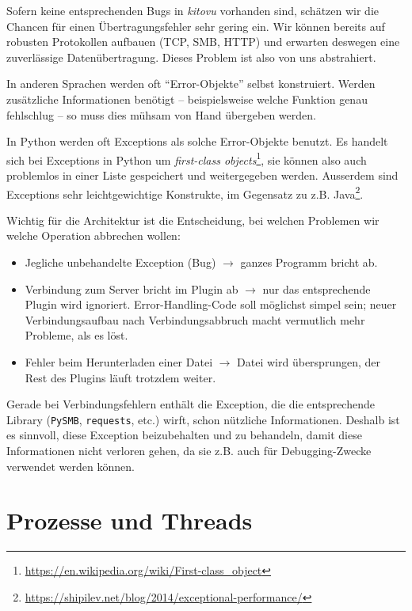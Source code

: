 \documentclass[a4paper]{article}
\let\oldsection\section
\renewcommand\section{\clearpage\oldsection}
\begin{document}
Sofern keine entsprechenden Bugs in \emph{kitovu} vorhanden sind, schätzen wir die
Chancen für einen Übertragungsfehler sehr gering ein. Wir können bereits auf robusten Protokollen aufbauen
(TCP, SMB, HTTP) und erwarten deswegen eine zuverlässige Datenübertragung. Dieses Problem ist also von uns abstrahiert.

In anderen Sprachen werden oft ``Error-Objekte'' selbst konstruiert. Werden
zusätzliche Informationen benötigt -- beispielsweise welche Funktion genau fehlschlug -- so muss dies mühsam von Hand übergeben werden.

In Python werden oft Exceptions als solche Error-Objekte benutzt. Es handelt
sich bei Exceptions in Python um \emph{first-class
  objects}\footnote{\url{https://en.wikipedia.org/wiki/First-class_object}}, sie
können also auch problemlos in einer Liste gespeichert und weitergegeben werden.
Ausserdem sind Exceptions sehr leichtgewichtige Konstrukte, im Gegensatz zu z.B.
Java\footnote{\url{https://shipilev.net/blog/2014/exceptional-performance/}}.

Wichtig für die Architektur ist die Entscheidung, bei welchen Problemen wir
welche Operation abbrechen wollen:

\begin{itemize}
  \item Jegliche unbehandelte Exception (Bug) $\rightarrow$ ganzes Programm bricht ab.
  \item Verbindung zum Server bricht im Plugin ab $\rightarrow$ nur das
    entsprechende Plugin wird ignoriert. Error-Handling-Code soll möglichst
    simpel sein; neuer Verbindungsaufbau nach Verbindungsabbruch macht
    vermutlich mehr Probleme, als es löst.
  \item Fehler beim Herunterladen einer Datei $\rightarrow$ Datei wird
    übersprungen, der Rest des Plugins läuft trotzdem weiter.
\end{itemize}

Gerade bei Verbindungsfehlern enthält die Exception, die die entsprechende
Library (\verb|PySMB|, \verb|requests|, etc.) wirft, schon nützliche Informationen. Deshalb
ist es sinnvoll, diese Exception beizubehalten und zu behandeln, damit diese
Informationen nicht verloren gehen, da sie z.B. auch für Debugging-Zwecke verwendet werden können.

\section{Prozesse und Threads}
\end{document}
